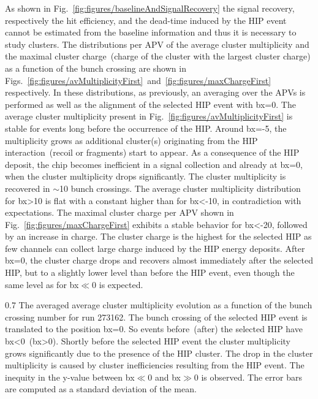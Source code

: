 As shown in Fig.~\ref{fig:figures/baselineAndSignalRecovery} the signal recovery, respectively the hit efficiency, and the dead-time induced by the HIP event cannot be estimated from the baseline information and thus it is necessary to study clusters. The distributions per APV of the average cluster multiplicity and the maximal cluster charge~(charge of the cluster with the largest cluster charge) as a function of the bunch crossing are shown in Figs.~\ref{fig:figures/avMultiplicityFirst}~and~\ref{fig:figures/maxChargeFirst} respectively. In these distributions, as previously, an averaging over the APVs is performed as well as the alignment of the selected HIP event with bx=0. The average cluster multiplicity present in Fig.~\ref{fig:figures/avMultiplicityFirst} is stable for events long before the occurrence of the HIP. Around bx=-5, the multiplicity grows as additional cluster(s) originating from the HIP interaction~(recoil or fragments) start to appear. As a consequence of the HIP deposit, the chip becomes inefficient in a signal collection and already at bx=0, when  the cluster multiplicity drops significantly. The cluster multiplicity is recovered in $\sim$10 bunch crossings. The average cluster multiplicity distribution for bx>10 is flat with a constant higher than for bx<-10, in contradiction with expectations. The maximal cluster charge per APV shown in Fig.~\ref{fig:figures/maxChargeFirst} exhibits a stable behavior for bx<-20, followed by an increase in charge. The cluster charge is the highest for the selected HIP as few channels can collect large charge induced by the HIP energy deposits. After bx=0, the cluster charge drops and recovers almost immediately after the selected HIP, but to a slightly lower level than before the HIP event, even though the same level as for bx$\ll$0 is expected. 



                 {0.7}       %
                 {The averaged average cluster multiplicity evolution as a function of the bunch crossing number for run 273162. The bunch crossing of the selected HIP event is translated to the position bx=0. So events before~(after) the selected HIP have bx<0~(bx>0). Shortly before the selected HIP event the cluster multiplicity grows significantly due to the presence of the HIP cluster. The drop in the cluster multiplicity is caused by cluster inefficiencies resulting from the HIP event. The inequity in the y-value between bx$\ll$0 and bx$\gg$0 is observed. The error bars are computed as a standard deviation of the mean. } %

